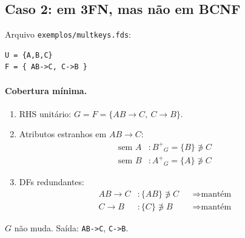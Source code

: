 \documentclass[11pt,a4paper]{article}
\newcommand{\fd}[2]{\ensuremath{#1 \to #2}}
\newcommand{\cl}[1]{\ensuremath{#1^{+}}}
\begin{document}
\subsection{Caso 2: em 3FN, mas não em BCNF}
\label{sec:caso2}

Arquivo \texttt{exemplos/multkeys.fds}:
\begin{verbatim}
U = {A,B,C}
F = { AB->C, C->B }
\end{verbatim}

\paragraph{Cobertura mínima.}
\begin{enumerate}
    \item RHS unitário: $G = F = \{\fd{AB}{C},\ \fd{C}{B}\}$.

    \item Atributos estranhos em \fd{AB}{C}:
        \begin{align*}
            \text{sem } A &: \cl{B}_{G} = \{B\} \not\ni C \\
            \text{sem } B &: \cl{A}_{G} = \{A\} \not\ni C
        \end{align*}

    \item DFs redundantes:
        \begin{align*}
            \fd{AB}{C} &: \{AB\} \not\ni C &&\Rightarrow \text{mantém} \\
            \fd{C}{B}  &: \{C\} \not\ni B  &&\Rightarrow \text{mantém}
        \end{align*}
\end{enumerate}
$G$ não muda. Saída: \texttt{AB->C}, \texttt{C->B}.
\end{document}
